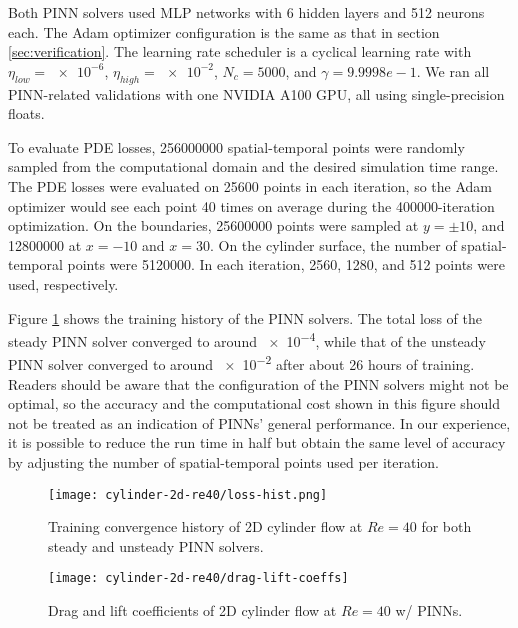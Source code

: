 Both PINN solvers used MLP networks with \num{6} hidden layers and \num{512} neurons each.
The Adam optimizer configuration is the same as that in section \ref{sec:verification}.
The learning rate scheduler is a cyclical learning rate with $\eta_{low}=\num{e-6}$, $\eta_{high}=\num{e-2}$, $N_c=\num{5000}$, and $\gamma={9.9998e-1}$.
We ran all PINN-related validations with one NVIDIA A100 GPU,
all using single-precision floats.

To evaluate PDE losses, \num{256000000} spatial-temporal points were randomly sampled from the computational domain and the desired simulation time range.
The PDE losses were evaluated on \num{25600} points in each iteration, so the Adam optimizer would see each point \num{40} times on average during the \num{400000}-iteration optimization.
On the boundaries, \num{25600000} points were sampled  at $y=\pm 10$, and \num{12800000} at $x=-10$ and $x=30$.
On the cylinder surface, the number of spatial-temporal points were \num{5120000}.
In each iteration, \num{2560}, \num{1280}, and \num{512} points were used, respectively.

Figure \ref{fig:cylinder-re40-pinn-loss} shows the training history of the PINN solvers.
The total loss of the steady PINN solver converged to around \num{e-4}, while that of the unsteady PINN solver converged to around \num{e-2} after about 26 hours of training.
Readers should be aware that the configuration of the PINN solvers might not be optimal, so the accuracy and the computational cost shown in this figure should not be treated as an indication of PINNs' general performance.
In our experience, it is possible to reduce the run time in half but obtain the same level of accuracy by adjusting the number of spatial-temporal points used per iteration.

\begin{figure}
    \centering%
    \texttt{[image: cylinder-2d-re40/loss-hist.png]}%
    \caption{%
        Training convergence history of 2D cylinder flow at $Re=\num{40}$ for both steady and unsteady PINN solvers.
    }
    \label{fig:cylinder-re40-pinn-loss}%
\end{figure}


\begin{figure}
    \centering%
    \texttt{[image: cylinder-2d-re40/drag-lift-coeffs]}%
    \caption{%
        Drag and lift coefficients of 2D cylinder flow at $Re=\num{40}$ w/ PINNs.
    }
    \label{fig:cylinder-re40-drag-lift}%
\end{figure}


